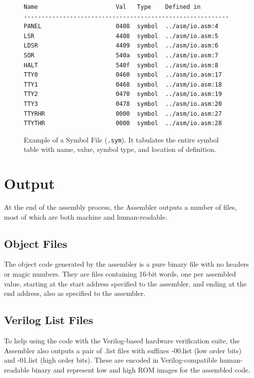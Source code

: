 \begin{figure}
\begin{lstlisting}[numbers=none]
Name                      Val   Type    Defined in
----------------------------------------------------------
PANEL                     0408  symbol  ../asm/io.asm:4
LSR                       4408  symbol  ../asm/io.asm:5
LDSR                      4409  symbol  ../asm/io.asm:6
SOR                       540a  symbol  ../asm/io.asm:7
HALT                      540f  symbol  ../asm/io.asm:8
TTY0                      0460  symbol  ../asm/io.asm:17
TTY1                      0468  symbol  ../asm/io.asm:18
TTY2                      0470  symbol  ../asm/io.asm:19
TTY3                      0478  symbol  ../asm/io.asm:20
TTYRHR                    0000  symbol  ../asm/io.asm:27
TTYTHR                    0000  symbol  ../asm/io.asm:28
\end{lstlisting}
\caption[Symbol File Example]{\label{fig:sym-file} Example of a Symbol File
  (\texttt{.sym}). It tabulates the entire symbol table with name, value,
  symbol type, and location of definition.}
\end{figure}



\section{Output}

At the end of the assembly process, the Assembler outputs a number of files,
most of which are both machine and human-readable.

\subsection{Object Files}

The object code generated by the assembler is a pure binary file with no
headers or magic numbers. They are files containing 16-bit words, one per
assembled value, starting at the start address specified to the assembler, and
ending at the end address, also as specified to the assembler.

\subsection{Verilog List Files}

To help using the code with the Verilog-based hardware verification suite, the
Assembler also outputs a pair of {\ttfamily .list} files with suffixes {\ttfamily -00.list}
(low order bits) and {\ttfamily -01.list} (high order bits). These are encoded in
Verilog-compatible human-readable binary and represent low and high ROM images
for the assembled code.

